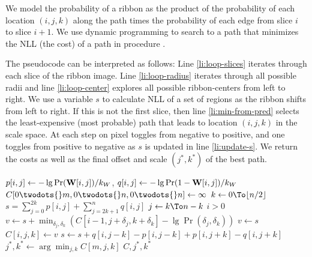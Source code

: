 We model the probability of a ribbon as the product of the probability of each location $(i, j, k)$ along the path times the probability of each edge from slice $i$ to slice $i+1$. We use dynamic programming to search to a path that minimizes the \ac{NLL} (the cost) of a path in procedure .

The pseudocode can be interpreted as follows: Line \ref{li:loop-slices} iterates through each slice of the ribbon image. Line \ref{li:loop-radius} iterates through all possible radii and line \ref{li:loop-center} explores all possible ribbon-centers from left to right. We use a variable $s$ to calculate \ac{NLL} of a set of regions as the ribbon shifts from left to right. If this is not the first slice, then line \ref{li:min-from-pred} selects the least-expensive (most probable) path that leads to location $(i, j, k)$ in the scale space.  At each step on pixel toggles from negative to positive, and one toggles from positive to negative as $s$ is updated in line \ref{li:update-s}.  We return the costs as well as the final offset and scale $(j^*, k^*)$ of the best path. 


\begin{codebox}
 \label{alg:segmet-ribbin}
\li $p[i,j]\gets -\lg \Pr(\mathbf{W}{}[i,j])/k_W{}$, 
          \hspace{2ex} $q[i,j] \gets -\lg \Pr(1-\mathbf{W}{}[i,j])/k_W{}$
\li $C{[0\twodots{}m, 0\twodots{}n, 0\twodots{}n]} \gets \infty$
\li {} \Do                                                \label{li:loop-slices}
\li     \For $k \gets 0 \To \lfloor n/2 \rfloor $ \Do                          \label{li:loop-radius}
\li         $s = \displaystyle{\sum_{j=0}^{2k} p[i,j] +\sum_{j=2k+1}^n  q[i, j] }$
\li         \For $j \gets k \To n-k$ \Do  \label{li:loop-center}
\li              \If $i > 0$  \Do                                              \label{li:if-has-pred}
\li              $v \gets s {+}\displaystyle{\min_{\delta_j, \delta_k}\left(  
                              C[i{-}1,j{+}\delta_j,k{+}\delta_k] -\lg \Pr(\delta_j, \delta_k)
                            \right)}$  
                               \label{li:min-from-pred}
\li              \Else $v\gets s$
                 \End
\li              $C{[i, j, k]} \gets v$                                       \label{li:dp-store}
\li              $s \gets s{+}q[i,j{-}k]{-}p[i, j{-}k]{+}p[i, j{+}k]{-}q[i,j{+}k]$ \label{li:update-s}
           \End
       \End
    \End
\li $j^*, k^* \gets \displaystyle{\arg\min_{j,k} C{[m, j, k]}}$
\li \Return $C, j^*, k^*$
\end{codebox}

